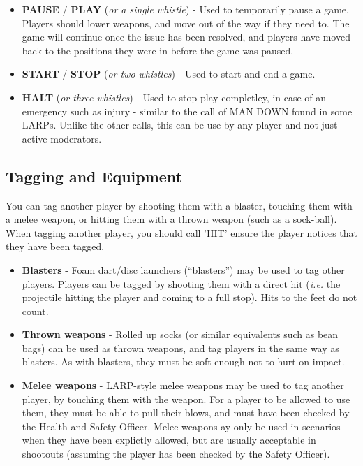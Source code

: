 \documentclass{article}
\begin{document}
		\begin{itemize}
			\item \textbf{PAUSE} / \textbf{PLAY} ({\em or a single whistle}) - Used to temporarily pause a game. Players should lower weapons, and move out of the way if they need to. The game will continue once the issue has been resolved, and players have moved back to the positions they were in before the game was paused.
			
			\item \textbf{START} / \textbf{STOP} ({\em or two whistles}) - Used to start and end a game.
			
			\item \textbf{HALT} ({\em or three whistles}) - Used to stop play completley, in case of an emergency such as injury - similar to the call of MAN DOWN found in some LARPs. Unlike the other calls, this can be use by any player and not just active moderators.
		\end{itemize}
		
	\subsection{Tagging and Equipment}
		
		You can tag another player by shooting them with a blaster, touching them with a melee weapon, or hitting them with a thrown weapon (such as a sock-ball). When tagging another player, you should call 'HIT' ensure the player notices that they have been tagged.

		\begin{itemize}
			\item \textbf{Blasters} - Foam dart/disc launchers (``blasters'') may be used to tag other players. Players can be tagged by shooting them with a direct hit ({\em i.e.} the projectile hitting the player and coming to a full stop). Hits to the feet do not count.
			
			\item \textbf{Thrown weapons} - Rolled up socks (or similar equivalents such as bean bags) can be used as thrown weapons, and tag players in the same way as blasters. As with blasters, they must be soft enough not to hurt on impact.
			
			\item \textbf{Melee weapons} - LARP-style melee weapons may be used to tag another player, by touching them with the weapon. For a player to be allowed to use them, they must be able to pull their blows, and must have been checked by the Health and Safety Officer. Melee weapons ay only be used in scenarios when they have been explictly allowed, but are usually acceptable in shootouts (assuming the player has been checked by the Safety Officer).
		\end{itemize}
	
\end{document}
